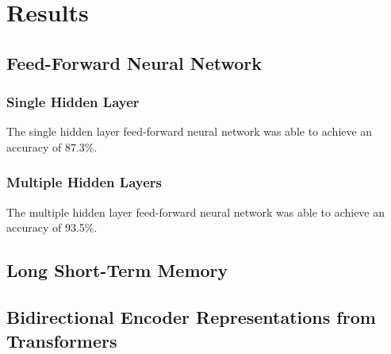 \section{Results}
\label{sec:results}

\subsection{Feed-Forward Neural Network}

\subsubsection{Single Hidden Layer} The single hidden layer
feed-forward neural network was able to achieve an accuracy of 87.3\%.

\subsubsection{Multiple Hidden Layers} The multiple hidden layer
feed-forward neural network was able to achieve an accuracy of 93.5\%.

\subsection{Long Short-Term Memory}

\subsection{Bidirectional Encoder Representations from Transformers}
